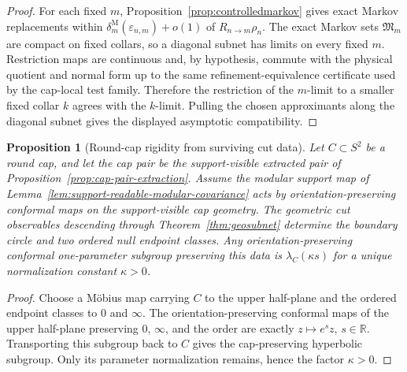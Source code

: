 \documentclass[11pt]{article}
\newtheorem{proposition}[theorem]{Proposition}
\begin{document}
\begin{proof}
For each fixed \(m\), Proposition~\ref{prop:controlledmarkov} gives exact
Markov replacements within
\(\delta^{\mathrm M}_{m}(\varepsilon_{n,m})+o(1)\) of \(R_{n\to m}\rho_n\).
The exact Markov sets \(\mathfrak M_m\) are compact on fixed collars, so a
diagonal subnet has limits on every fixed \(m\). Restriction maps are
continuous and, by hypothesis, commute with the physical quotient and normal
form up to the same refinement-equivalence certificate used by the cap-local
test family. Therefore the restriction of the \(m\)-limit to a smaller fixed
collar \(k\) agrees with the \(k\)-limit. Pulling the chosen approximants along
the diagonal subnet gives the displayed asymptotic compatibility.
\end{proof}

\begin{proposition}[Round-cap rigidity from surviving cut data]\label{prop:round-cap-rigidity}
Let \(C\subset S^2\) be a round cap, and let the cap pair be the support-visible extracted pair of Proposition~\ref{prop:cap-pair-extraction}. Assume the modular support map of Lemma~\ref{lem:support-readable-modular-covariance} acts by orientation-preserving conformal maps on the support-visible cap geometry. The geometric cut observables descending through Theorem~\ref{thm:geosubnet} determine the boundary circle and two ordered null endpoint classes. Any orientation-preserving conformal one-parameter subgroup preserving this data is \(\lambda_C(\kappa s)\) for a unique normalization constant \(\kappa>0\).
\end{proposition}

\begin{proof}
Choose a M\"obius map carrying \(C\) to the upper half-plane and the ordered endpoint classes to \(0\) and \(\infty\). The orientation-preserving conformal maps of the upper half-plane preserving \(0\), \(\infty\), and the order are exactly \(z\mapsto e^s z\), \(s\in\mathbb R\). Transporting this subgroup back to \(C\) gives the cap-preserving hyperbolic subgroup. Only its parameter normalization remains, hence the factor \(\kappa>0\).
\end{proof}
\end{document}

